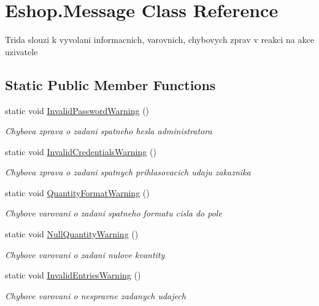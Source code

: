 \hypertarget{class_eshop_1_1_message}{}\section{Eshop.\+Message Class Reference}
\label{class_eshop_1_1_message}


Trida slouzi k vyvolani informacnich, varovnich, chybovych zprav v reakci na akce uzivatele  


\subsection*{Static Public Member Functions}
\begin{DoxyCompactItemize}
\item 
static void \mbox{\hyperlink{class_eshop_1_1_message_ac09dfcff0e3dd57daf5201b4dc067628}{Invalid\+Password\+Warning}} ()
\begin{DoxyCompactList}\small\item\em Chybova zprava o zadani spatneho hesla administratora \end{DoxyCompactList}\item 
static void \mbox{\hyperlink{class_eshop_1_1_message_ad267192472e20da18e864fb0b9ff99c7}{Invalid\+Credentials\+Warning}} ()
\begin{DoxyCompactList}\small\item\em Chybova zprava o zadani spatnych prihlasovacich udaju zakaznika \end{DoxyCompactList}\item 
static void \mbox{\hyperlink{class_eshop_1_1_message_a5f220c2649c5747b92eacf54ec271a24}{Quantity\+Format\+Warning}} ()
\begin{DoxyCompactList}\small\item\em Chybove varovani o zadani spatneho formatu cisla do pole \end{DoxyCompactList}\item 
static void \mbox{\hyperlink{class_eshop_1_1_message_a22381f9edb7f12ad6f3ec13db3c19409}{Null\+Quantity\+Warning}} ()
\begin{DoxyCompactList}\small\item\em Chybove varovani o zadani nulove kvantity \end{DoxyCompactList}\item 
static void \mbox{\hyperlink{class_eshop_1_1_message_abf2f3c2c283038881294ed1837cc96dd}{Invalid\+Entries\+Warning}} ()
\begin{DoxyCompactList}\small\item\em Chybove varovani o nespravne zadanych udajech \end{DoxyCompactList}\item 

\end{DoxyCompactItemize}
